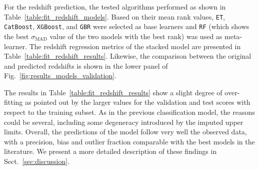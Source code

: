 \documentclass{aa}
\begin{document}
For the redshift prediction, the tested algorithms performed as shown in Table~\ref{table:fit_redshift_models}. 
Based on their mean rank values, \verb|ET|, \verb|CatBoost|, \verb|XGBoost|, and \verb|GBR| were selected as base learners and \verb|RF| (which shows the best $\sigma_{\mathrm{MAD}}$ value of the two models with the best rank) was used as meta-learner.
The redshift regression metrics of the stacked model are presented in Table~\ref{table:fit_redshift_results}. 
Likewise, the comparison between the original and predicted redshifts is shown in the lower panel of Fig.~\ref{fig:results_models_validation}.

\begin{table}
\setlength{\tabcolsep}{3pt}
\caption{Redshift prediction metrics for the training, test, and validation subsets for HETDEX \& Stripe 82 as discussed in Sect.~\ref{sec:results_prediction_pipeline}.}             %
\label{table:fit_redshift_results}      %
\centering                          %
\end{table}

The results in Table~\ref{table:fit_redshift_results} show a slight degree of over-fitting as pointed out by the larger values for the validation and test scores with respect to the training subset. As in the previous classification model, the reasons could be several, including some degeneracy introduced by the imputed upper limits. Overall, the predictions of the model follow very well the observed data, with a precision, bias and outlier fraction comparable with the best models in the literature. We present a more detailed description of these findings in Sect.~\ref{sec:discussion}.
\end{document}
